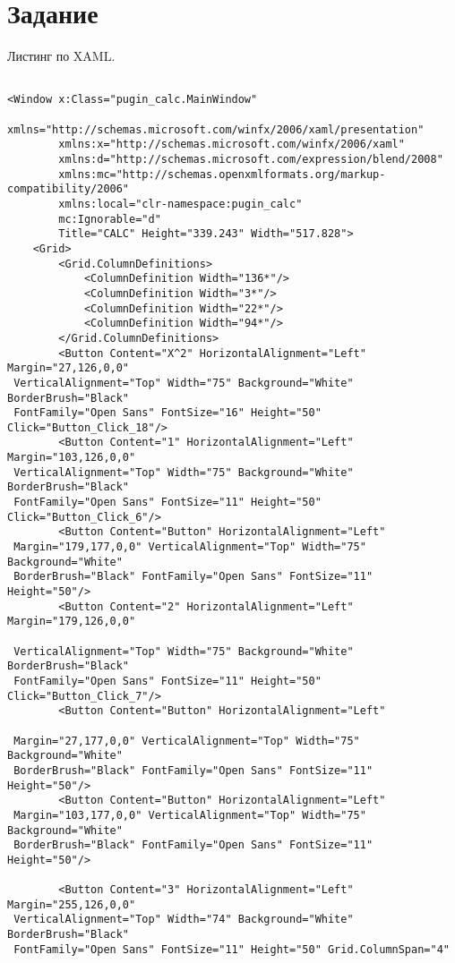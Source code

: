 \section*{Задание}
{
\verbatimFont
Листинг по XAML.
\small
\begin{verbatim}

<Window x:Class="pugin_calc.MainWindow"
        xmlns="http://schemas.microsoft.com/winfx/2006/xaml/presentation"
        xmlns:x="http://schemas.microsoft.com/winfx/2006/xaml"
        xmlns:d="http://schemas.microsoft.com/expression/blend/2008"
        xmlns:mc="http://schemas.openxmlformats.org/markup-compatibility/2006"
        xmlns:local="clr-namespace:pugin_calc"
        mc:Ignorable="d"
        Title="CALC" Height="339.243" Width="517.828">
    <Grid>
        <Grid.ColumnDefinitions>
            <ColumnDefinition Width="136*"/>
            <ColumnDefinition Width="3*"/>
            <ColumnDefinition Width="22*"/>
            <ColumnDefinition Width="94*"/>
        </Grid.ColumnDefinitions>
        <Button Content="X^2" HorizontalAlignment="Left" Margin="27,126,0,0"
 VerticalAlignment="Top" Width="75" Background="White" BorderBrush="Black"
 FontFamily="Open Sans" FontSize="16" Height="50" Click="Button_Click_18"/>
        <Button Content="1" HorizontalAlignment="Left" Margin="103,126,0,0"
 VerticalAlignment="Top" Width="75" Background="White" BorderBrush="Black"
 FontFamily="Open Sans" FontSize="11" Height="50" Click="Button_Click_6"/>
        <Button Content="Button" HorizontalAlignment="Left"
 Margin="179,177,0,0" VerticalAlignment="Top" Width="75" Background="White"
 BorderBrush="Black" FontFamily="Open Sans" FontSize="11" Height="50"/>
        <Button Content="2" HorizontalAlignment="Left" Margin="179,126,0,0"

 VerticalAlignment="Top" Width="75" Background="White" BorderBrush="Black"
 FontFamily="Open Sans" FontSize="11" Height="50" Click="Button_Click_7"/>
        <Button Content="Button" HorizontalAlignment="Left"

 Margin="27,177,0,0" VerticalAlignment="Top" Width="75" Background="White"
 BorderBrush="Black" FontFamily="Open Sans" FontSize="11" Height="50"/>
        <Button Content="Button" HorizontalAlignment="Left"
 Margin="103,177,0,0" VerticalAlignment="Top" Width="75" Background="White"
 BorderBrush="Black" FontFamily="Open Sans" FontSize="11" Height="50"/>

        <Button Content="3" HorizontalAlignment="Left" Margin="255,126,0,0"
 VerticalAlignment="Top" Width="74" Background="White" BorderBrush="Black"
 FontFamily="Open Sans" FontSize="11" Height="50" Grid.ColumnSpan="4"


\end{verbatim}}
